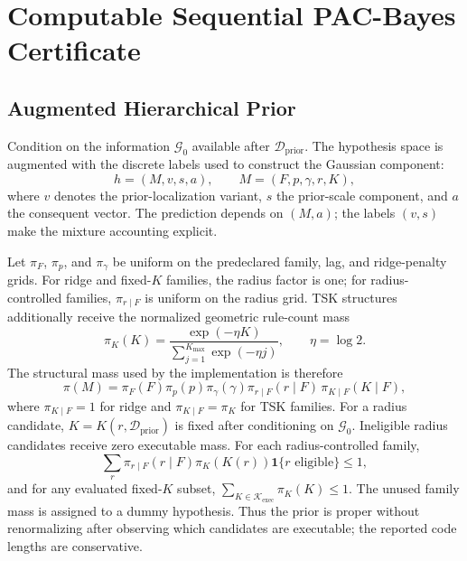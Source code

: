 \section{Computable Sequential PAC-Bayes Certificate}
\label{sec:certificate}

\subsection{Augmented Hierarchical Prior}
Condition on the information $\mathcal G_0$ available after $\mathcal D_{\mathrm{prior}}$. The hypothesis space is augmented with the discrete labels used to construct the Gaussian component:
\begin{equation}
 h=(M,v,s,a),\qquad M=(F,p,\gamma,r,K),
\label{eq:augmented_hypothesis}
\end{equation}
where $v$ denotes the prior-localization variant, $s$ the prior-scale component, and $a$ the consequent vector. The prediction depends on $(M,a)$; the labels $(v,s)$ make the mixture accounting explicit.

Let $\pi_F$, $\pi_p$, and $\pi_\gamma$ be uniform on the predeclared family, lag, and ridge-penalty grids. For ridge and fixed-$K$ families, the radius factor is one; for radius-controlled families, $\pi_{r\mid F}$ is uniform on the radius grid. TSK structures additionally receive the normalized geometric rule-count mass
\begin{equation}
\pi_K(K)=\frac{\exp(-\eta K)}{\sum_{j=1}^{K_{\max}}\exp(-\eta j)},\qquad \eta=\log 2.
\label{eq:kprior}
\end{equation}
The structural mass used by the implementation is therefore
\begin{equation}
\pi(M)=\pi_F(F)\pi_p(p)\pi_\gamma(\gamma)\pi_{r\mid F}(r\mid F)\,\pi_{K\mid F}(K\mid F),
\label{eq:structural_prior}
\end{equation}
where $\pi_{K\mid F}=1$ for ridge and $\pi_{K\mid F}=\pi_K$ for TSK families. For a radius candidate, $K=K(r,\mathcal D_{\mathrm{prior}})$ is fixed after conditioning on $\mathcal G_0$. Ineligible radius candidates receive zero executable mass. For each radius-controlled family,
\begin{equation}
\sum_{r}\pi_{r\mid F}(r\mid F)\pi_K\!\left(K(r)\right)\mathbf 1\{r\text{ eligible}\}\le 1,
\end{equation}
and for any evaluated fixed-$K$ subset, $\sum_{K\in\mathcal K_{\mathrm{exec}}}\pi_K(K)\le1$. The unused family mass is assigned to a dummy hypothesis. Thus the prior is proper without renormalizing after observing which candidates are executable; the reported code lengths are conservative.

